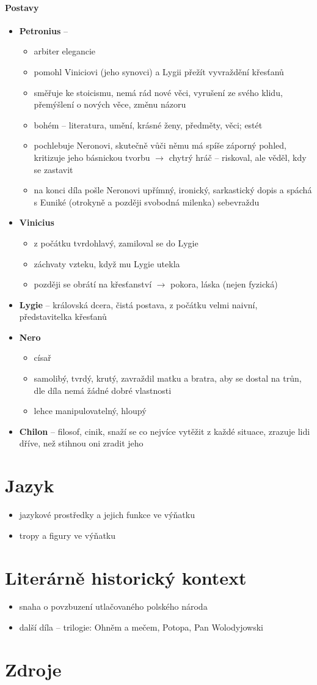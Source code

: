 \documentclass[10pt,a4paper]{article}
\newcommand{\ra}{$\rightarrow$ }
\begin{document}
\paragraph{Postavy}
\begin{itemize}
\item \textbf{Petronius} --  
	\begin{itemize}
	\item arbiter elegancie
	\item pomohl Viniciovi (jeho synovci) a Lygii přežít vyvraždění křesťanů
	\item směřuje ke stoicismu, nemá rád nové věci, vyrušení ze svého klidu, přemýšlení o nových věce, změnu názoru
	\item bohém -- literatura, umění, krásné ženy, předměty, věci; estét 
	\item pochlebuje Neronovi, skutečně vůči němu má spíše záporný pohled, kritizuje jeho básnickou tvorbu \ra chytrý hráč -- riskoval, ale věděl, kdy se zastavit
	\item na konci díla pošle Neronovi upřímný, ironický, sarkastický dopis a spáchá s Euniké (otrokyně a později svobodná milenka) sebevraždu 
	\end{itemize}
\item \textbf{Vinicius}
	\begin{itemize}
	\item z počátku tvrdohlavý, zamiloval se do Lygie
	\item záchvaty vzteku, když mu Lygie utekla
	\item později se obrátí na křesťanství \ra pokora, láska (nejen fyzická)
	\end{itemize}
\item \textbf{Lygie} -- královská dcera, čistá postava, z počátku velmi naivní, představitelka křesťanů
\item \textbf{Nero} 
	\begin{itemize}
	\item císař
	\item samolibý, tvrdý, krutý, zavraždil matku a bratra, aby se dostal na trůn, dle díla nemá žádné dobré vlastnosti
	\item lehce manipulovatelný, hloupý
	\end{itemize}
\item \textbf{Chilon} -- filosof, cinik, snaží se co nejvíce vytěžit z každé situace, zrazuje lidi dříve, než stihnou oni zradit jeho
\end{itemize}
\section*{Jazyk}
\begin{itemize}
\item jazykové prostředky a jejich funkce ve výňatku
\item tropy a figury ve výňatku
\end{itemize}
\section*{Literárně historický kontext}
\begin{itemize}
\item snaha o povzbuzení utlačovaného polského národa
\item další díla -- trilogie: Ohněm a mečem, Potopa, Pan Wolodyjowski
\end{itemize}
\section*{Zdroje}
\end{document}
